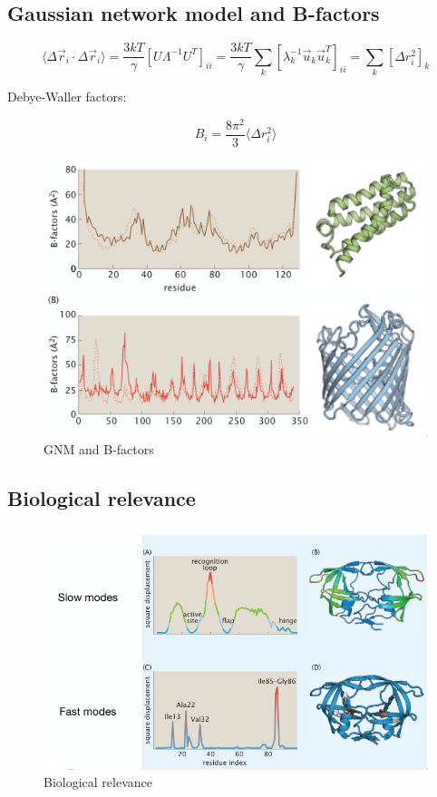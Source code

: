 	\subsection{Gaussian network model and B-factors}

	$$\langle\Delta\vec{r}_i\cdot\Delta\vec{r}_i\rangle = \frac{3kT}{\gamma}[U\Lambda^{-1}U^{T}]_{ii} = \frac{3kT}{\gamma}\sum\limits_{k}[\lambda_k^{-1}\vec{u}_k\vec{u}_k^T]_{ii} = \sum\limits_{k}[\Delta r_i^2]_k$$

	Debye-Waller factors:

	$$B_i = \frac{8\pi^2}{3}\langle\Delta r_i^2\rangle$$

	\begin{figure}[H]
		\includegraphics[width=\textwidth]{gnm-b-factors}
		\caption{GNM and B-factors}
		\label{fig:gnn-b-factors}
	\end{figure}

	\subsection{Biological relevance}

	\begin{figure}[H]
		\includegraphics[width=\textwidth]{biological-relevance}
		\caption{Biological relevance}
		\label{fig:biological-relevance}
	\end{figure}

